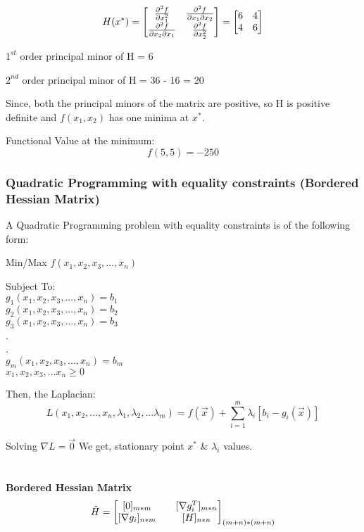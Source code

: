 \documentclass[12pt, letterpaper]{article}
\begin{document}
\begin{equation}
    H(x^*) = \begin{bmatrix}
\pdv[2]{f}{x_1} & \pdv{f}{x_1}{x_2} \\
\pdv{f}{x_2}{x_1} & \pdv[2]{f}{x_2} 
\end{bmatrix} = \begin{bmatrix}
6 & 4 \\
4 & 6
\end{bmatrix}
\end{equation}

\therefore \hspace{0.2cm} $1^{st}$ order principal minor of H = 6

\therefore \hspace{0.2cm} $2^{nd}$ order principal minor of H = 36 - 16 = 20

Since, both the principal minors of the matrix are positive, so H is positive definite and $f(x_1,x_2)$ has one minima at $x^*$.

Functional Value at the minimum:
$$ f(5,5) = -250 $$
\subsubsection{Quadratic Programming with equality constraints (Bordered Hessian Matrix)}

A Quadratic Programming problem with equality constraints is of the following form:

Min/Max $f(x_1,x_2,x_3,...,x_n)$

Subject To: \\
$ g_1(x_1,x_2,x_3,...,x_n) = b_1$ \\
$ g_2(x_1,x_2,x_3,...,x_n) = b_2$ \\
$ g_3(x_1,x_2,x_3,...,x_n) = b_3$ \\
. \\
. \\
$ g_m(x_1,x_2,x_3,...,x_n) = b_m$ \\
$x_1, x_2, x_3, ... x_n \geq 0 $

Then, the Laplacian:
    $$L(x_1,x_2,...,x_n,\lambda_1,\lambda_2, ... \lambda_m) = f(\overrightarrow x) + \sum_{i=1}^m \lambda_i [b_i - g_i(\overrightarrow x)]$$
    
    Solving $\nabla L = \overrightarrow 0$
    We get, stationary point $x^*$ \& $\lambda_i$ values.
    \\
    \\
    \\
\textbf{Bordered Hessian Matrix}
\begin{equation}
    \Tilde{H} = \begin{bmatrix}
    [0]_{m*m} && [\nabla g_i^T]_{m*n} \\ [\nabla g_i]_{n*m} && [H]_{n*n}
    \end{bmatrix}_{(m+n)*(m+n)}
\end{equation}
\end{document}
